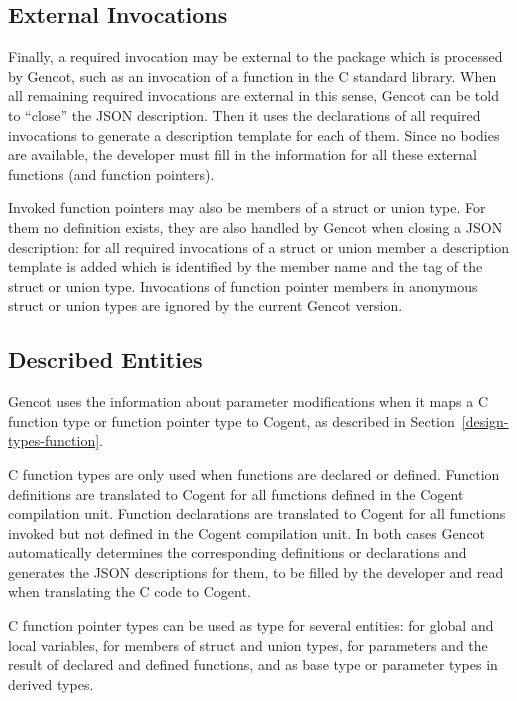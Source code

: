 \subsection{External Invocations}

Finally, a required invocation may be external to the package which is processed by Gencot, such as an invocation of
a function in the C standard library. When all remaining required invocations are external in this sense, Gencot
can be told to ``close'' the JSON description. Then it uses the declarations of all required invocations to generate
a description template for each of them. Since no bodies are available, the developer must fill in the information
for all these external functions (and function pointers).

Invoked function pointers may also be members of a struct or union type. For them no definition exists, they are also 
handled by Gencot when closing a JSON description: for all required invocations of a struct or union member a 
description template is added which is identified by the member name and the tag of the struct or union type. Invocations
of function pointer members in anonymous struct or union types are ignored by the current Gencot version.
 
\subsection{Described Entities}

Gencot uses the information about parameter modifications when it maps a C function type or function pointer type
to Cogent, as described in Section~\ref{design-types-function}. 

C function types are only used when functions are declared or defined. Function definitions are translated to
Cogent for all functions defined in the Cogent compilation unit. Function declarations are translated to Cogent
for all functions invoked but not defined in the Cogent compilation unit. In both cases Gencot automatically 
determines the corresponding definitions or declarations and generates the JSON descriptions for them, to be
filled by the developer and read when translating the C code to Cogent.

C function pointer types can be used as type for several entities: for global and local variables, for members of struct
and union types, for parameters and the result of declared and defined functions, and as base type or parameter 
types in derived types.

